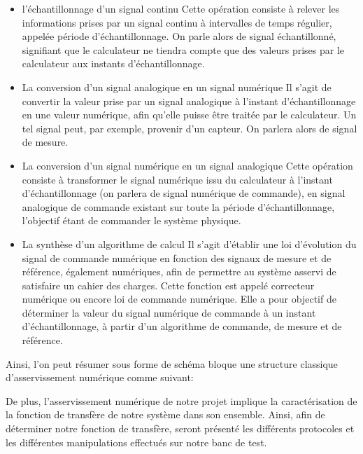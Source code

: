 \documentclass[french,a4paper,12pt]{report}
\begin{document}
	\begin{itemize}
		\item l'échantillonnage d'un signal continu
			Cette opération consiste à relever les informations prises par un signal continu à intervalles de temps
			régulier, appelée période d'échantillonnage. On parle alors de signal échantillonné, signifiant que le
			calculateur ne tiendra compte que des valeurs prises par le calculateur aux instants d'échantillonnage.
			
		\item La conversion d'un signal analogique en un signal numérique
			Il s'agit de convertir la valeur prise par un signal analogique à l'instant d'échantillonnage en une
			valeur numérique, afin qu'elle puisse être traitée par le calculateur. Un tel signal peut, par exemple, 
			provenir d'un capteur. On parlera alors de signal de mesure.
			 
		\item La conversion d'un signal numérique en un signal analogique
			Cette opération consiste à transformer le signal numérique issu du calculateur à l'instant 
			d'échantillonnage (on parlera de signal numérique de commande), en signal analogique de commande 
			existant sur toute la période d'échantillonnage, l'objectif étant de commander le système physique.
			
		\item  La synthèse d'un algorithme de calcul
			Il s'agit d'établir une loi d'évolution du signal de commande numérique en fonction des signaux de mesure
			et de référence, également numériques, afin de permettre au système asservi de satisfaire un cahier des
			charges. Cette fonction est appelé correcteur numérique ou encore loi de commande numérique. Elle a pour
			objectif de déterminer la valeur du signal numérique de commande à un instant d'échantillonnage, à partir 
			d'un algorithme de commande, de mesure et de référence.
	\end{itemize}
	
	Ainsi, l'on peut résumer sous forme de schéma bloque une structure classique d'asservissement numérique comme suivant:
	
	
	De plus, l'asservissement numérique de notre projet implique la caractérisation de la fonction de transfère de notre système dans son ensemble.
	Ainsi, afin de déterminer notre fonction de transfère, seront présenté les différents protocoles et les différentes manipulations effectués sur notre banc de test.
\end{document}
